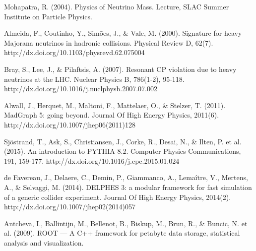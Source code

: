 \documentclass[11pt, oneside]{book}
\begin{document}
\begin{thebibliography}{10}
 Mohapatra, R. (2004). Physics of Neutrino Mass. Lecture, SLAC Summer Institute on Particle Physics.

 Almeida, F., Coutinho, Y., Simões, J., \& Vale, M. (2000). Signature for heavy Majorana neutrinos in hadronic collisions. Physical Review D, 62(7). http://dx.doi.org/10.1103/physrevd.62.075004

Bray, S., Lee, J., \& Pilaftsis, A. (2007). Resonant CP violation due to heavy neutrinos at the LHC. Nuclear Physics B, 786(1-2), 95-118. http://dx.doi.org/10.1016/j.nuclphysb.2007.07.002

 Alwall, J., Herquet, M., Maltoni, F., Mattelaer, O., \& Stelzer, T. (2011). MadGraph 5: going beyond. Journal Of High Energy Physics, 2011(6). http://dx.doi.org/10.1007/jhep06(2011)128

Sjöstrand, T., Ask, S., Christiansen, J., Corke, R., Desai, N., \& Ilten, P. et al. (2015). An introduction to PYTHIA 8.2. Computer Physics Communications, 191, 159-177. http://dx.doi.org/10.1016/j.cpc.2015.01.024

 de Favereau, J., Delaere, C., Demin, P., Giammanco, A., Lemaître, V., Mertens, A., \& Selvaggi, M. (2014). DELPHES 3: a modular framework for fast simulation of a generic collider experiment. Journal Of High Energy Physics, 2014(2). http://dx.doi.org/10.1007/jhep02(2014)057

 Antcheva, I., Ballintijn, M., Bellenot, B., Biskup, M., Brun, R., \& Buncic, N. et al. (2009). ROOT — A C++ framework for petabyte data storage, statistical analysis and visualization.

\end{thebibliography}
\end{document}
